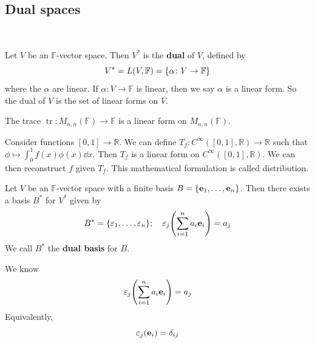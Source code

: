 \documentclass[a4paper]{article}
\begin{document}
\subsection{Dual spaces}\ \vspace*{-1.5em}
\begin{definition}
	Let \( V \) be an \( \mathbb{F} \)-vector space.
	Then \( V^* \) is the \textbf{dual} of \( V \), defined by
	\[
		V^* = L(V,\mathbb F) = \qty{\alpha \colon V \to \mathbb F}
	\]
	where the \( \alpha \) are linear.
	If \( \alpha \colon V \to \mathbb F \) is linear, then we say \( \alpha \) is a linear form.
	So the dual of \( V \) is the set of linear forms on \( V \).
\end{definition}
\begin{example}
	The trace \( \operatorname{tr} \colon M_{n,n}(\mathbb F) \to \mathbb F \) is a linear form on \( M_{n,n}(\mathbb F) \).
\end{example}
\begin{example}
	Consider functions \( [0,1] \to \mathbb R \).
	We can define \( T_f \colon C^\infty([0,1], \mathbb R) \to \mathbb R \) such that \( \phi \mapsto \int_0^1 f(x) \phi(x) \dd{x} \).
	Then \( T_f \) is a linear form on \( C^{\infty}([0,1], \mathbb R) \).
	We can then reconstruct \( f \) given \( T_f \).
	This mathematical formulation is called distribution.
\end{example}
\begin{lemma}
	Let \( V \) be an \( \mathbb F \)-vector space with a finite basis \( B = \qty{{\bf e}_1, \dots, {\bf e}_n} \).
	Then there exists a basis \( B^* \) for \( V^* \) given by
	\[
		B^* = \qty{\varepsilon_1, \dots, \varepsilon_n}; \quad \varepsilon_j \qty( \sum_{i=1}^n a_i {\bf e}_i ) = a_j
	\]
	We call \( B^* \) the \textbf{dual basis} for \( B \).
\end{lemma}
We know
\[
    \varepsilon_j \qty( \sum_{i=1}^n a_i {\bf e}_i ) = a_j
\]
Equivalently,
\[
    \varepsilon_j ({\bf e}_i) = \delta_{ij}
\]
\end{document}
